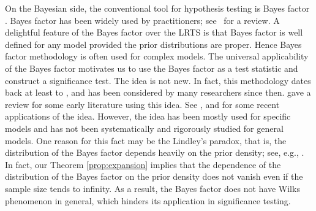 \documentclass[11pt]{article}
\theoremstyle{plain}
\theoremstyle{definition}
\theoremstyle{remark}
\begin{document}
On the Bayesian side, the conventional tool for hypothesis testing is Bayes factor \citep{scientificInference}.
Bayes factor has been widely used by practitioners; see~\cite{Robert1995Bayes} for a review.
A delightful feature of the Bayes factor over the LRTS is that Bayes factor is well defined for any model provided the prior distributions are proper.
Hence Bayes factor methodology is often used for complex models.
The universal applicability of the Bayes factor motivates us to use the Bayes factor as a test statistic and construct a significance test.
The idea is not new.
In fact, this methodology dates back at least to \cite{Good1967}, and has been considered by many researchers since then.
\cite{Good1992} gave a review for some early literature using this idea.
See \cite{Aerts2004}, \cite{zhou2018On} and \cite{Wang2020} for some recent applications of the idea.
However, %
the idea has been mostly used for specific models and has not been systematically and rigorously studied for general models.
One reason for this fact may be the Lindley's paradox, that is, the distribution of the Bayes factor depends heavily on the prior density; see, e.g., \cite{Shafer1982}.
In fact, our Theorem \ref{prop:expansion} implies that the dependence of the distribution of the Bayes factor on the prior density does not vanish even if the sample size tends to infinity.
As a result, the Bayes factor does not have Wilks phenomenon in general, which hinders its application in significance testing.
\end{document}
